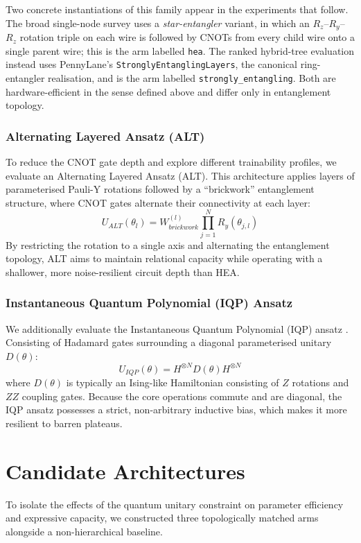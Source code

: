 \documentclass[12pt, a4paper, oneside]{report}
\begin{document}
Two concrete instantiations of this family appear in the experiments that follow. The broad single-node survey uses a \textit{star-entangler} variant, in which an $R_z$--$R_y$--$R_z$ rotation triple on each wire is followed by CNOTs from every child wire onto a single parent wire; this is the arm labelled \texttt{hea}. The ranked hybrid-tree evaluation instead uses PennyLane's \texttt{StronglyEntanglingLayers}, the canonical ring-entangler realisation, and is the arm labelled \texttt{strongly\_entangling}. Both are hardware-efficient in the sense defined above and differ only in entanglement topology.

\subsubsection{Alternating Layered Ansatz (ALT)}
To reduce the CNOT gate depth and explore different trainability profiles, we evaluate an Alternating Layered Ansatz (ALT). This architecture applies layers of parameterised Pauli-Y rotations followed by a ``brickwork'' entanglement structure, where CNOT gates alternate their connectivity at each layer:
\begin{equation}
    U_{ALT}(\theta_l) = W_{brickwork}^{(l)} \prod_{j=1}^N R_y(\theta_{j,l})
\end{equation}
By restricting the rotation to a single axis and alternating the entanglement topology, ALT aims to maintain relational capacity while operating with a shallower, more noise-resilient circuit depth than HEA.

\subsubsection{Instantaneous Quantum Polynomial (IQP) Ansatz}
We additionally evaluate the Instantaneous Quantum Polynomial (IQP) ansatz \cite{iqp_ansatz, havlicek2019}. Consisting of Hadamard gates surrounding a diagonal parameterised unitary $D(\theta)$:
\begin{equation}
    U_{IQP}(\theta) = H^{\otimes N} D(\theta) H^{\otimes N}
\end{equation}
where $D(\theta)$ is typically an Ising-like Hamiltonian consisting of $Z$ rotations and $ZZ$ coupling gates. Because the core operations commute and are diagonal, the IQP ansatz possesses a strict, non-arbitrary inductive bias, which makes it more resilient to barren plateaus.


\section{Candidate Architectures}
To isolate the effects of the quantum unitary constraint on parameter efficiency and expressive capacity, we constructed three topologically matched arms alongside a non-hierarchical baseline.
\end{document}
